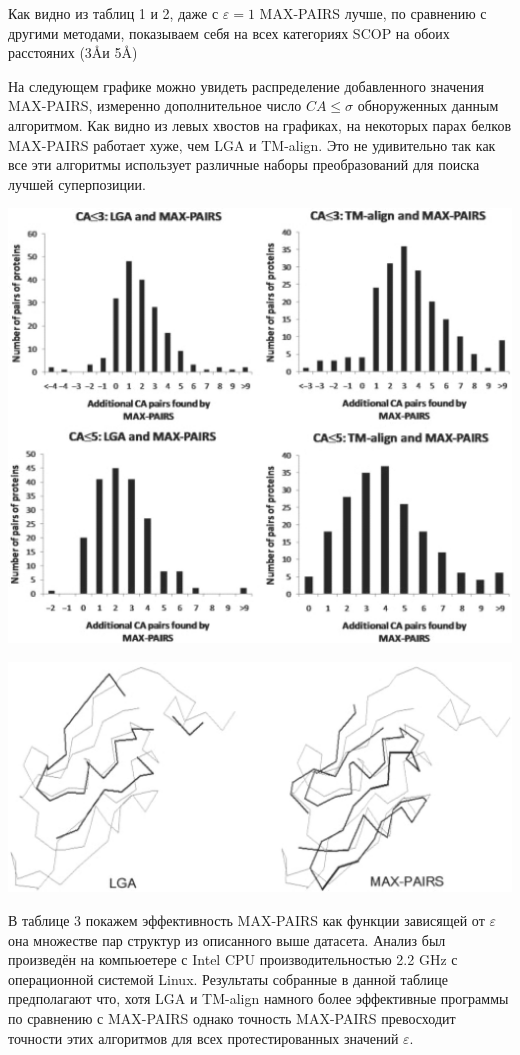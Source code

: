 \documentclass[a4papper]{article}
\newcommand{\angstrom}{\text\normalfont\AA}
\newcommand{\eps}{\varepsilon}
\begin{document}
Как видно из таблиц 1 и 2, даже с $\eps=1$ MAX-PAIRS лучше, по сравнению с другими методами, показываем себя на всех категориях SCOP на обоих расстояних (3\angstrom и 5\angstrom)

На следующем графике можно увидеть распределение добавленного значения MAX-PAIRS, измеренно дополнительное число $CA \leq \sigma$ обноруженных данным алгоритмом. Как видно из левых хвостов на графиках, на некоторых парах белков MAX-PAIRS работает хуже, чем LGA и TM-align. Это не удивительно так как все эти алгоритмы использует различные наборы преобразований для поиска лучшей суперпозиции.

\includegraphics[scale=0.25]{../pictures/btp530f3.jpeg}

\includegraphics[scale=0.25]{../pictures/btp530f4.jpeg}

В таблице 3 покажем эффективность MAX-PAIRS как функции зависящей от $\eps$ она множестве пар структур из описанного выше датасета. Анализ был произведён на компьюетере с Intel CPU производительностью 2.2 GHz с операционной системой Linux. Результаты собранные в данной таблице предполагают что, хотя LGA и TM-align намного более эффективные программы по сравнению с MAX-PAIRS однако точность MAX-PAIRS превосходит точности этих алгоритмов для всех протестированных значений $\eps$.
\end{document}
